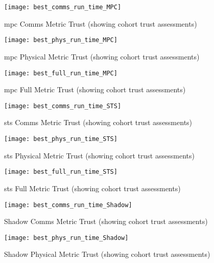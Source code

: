 \begin{figure}[h]
  \centering
  \texttt{[image: best\_comms\_run\_time\_MPC]}
  \caption{\gls{mpc} Comms Metric Trust (showing cohort trust assessments)}
  \label{fig:comms_time_mpc}
\end{figure}

\begin{figure}[h]
  \centering
  \texttt{[image: best\_phys\_run\_time\_MPC]}
  \caption{\gls{mpc} Physical Metric Trust (showing cohort trust assessments)}
  \label{fig:phys_time_mpc}
\end{figure}

\begin{figure}[h]
  \centering
  \texttt{[image: best\_full\_run\_time\_MPC]}
  \caption{\gls{mpc} Full Metric Trust (showing cohort trust assessments)}
  \label{fig:full_time_mpc}
\end{figure}


\begin{figure}[h]
  \centering
  \texttt{[image: best\_comms\_run\_time\_STS]}
  \caption{\gls{sts} Comms Metric Trust (showing cohort trust assessments)}
  \label{fig:comms_time_sts}
\end{figure}

\begin{figure}[h]
  \centering
  \texttt{[image: best\_phys\_run\_time\_STS]}
  \caption{\gls{sts} Physical Metric Trust (showing cohort trust assessments)}
  \label{fig:phys_time_sts}
\end{figure}

\begin{figure}[h]
  \centering
  \texttt{[image: best\_full\_run\_time\_STS]}
  \caption{\gls{sts} Full Metric Trust (showing cohort trust assessments)}
  \label{fig:full_time_sts}
\end{figure}



\begin{figure}[h]
  \centering
  \texttt{[image: best\_comms\_run\_time\_Shadow]}
  \caption{Shadow Comms Metric Trust (showing cohort trust assessments)}
  \label{fig:comms_time_shadow}
\end{figure}

\begin{figure}[h]
  \centering
  \texttt{[image: best\_phys\_run\_time\_Shadow]}
  \caption{Shadow Physical Metric Trust (showing cohort trust assessments)}
  \label{fig:phys_time_shadow}
\end{figure}

